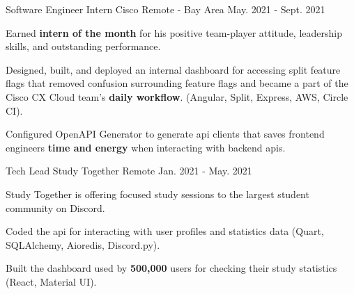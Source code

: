 

\begin{cventries}




  \cventry
  {Software Engineer Intern}
  {Cisco}
  {Remote - Bay Area}
  {May. 2021 - Sept. 2021}
  {
    \begin{cvitems}
    \item{Earned \textbf{intern of the month} for his positive team-player attitude, leadership skills, and outstanding performance.}
    \item{Designed, built, and deployed an internal dashboard for accessing split feature flags that removed confusion surrounding feature flags and became a part of the Cisco CX Cloud team's \textbf{daily workflow}. (Angular, Split, Express, AWS, Circle CI).}
    \item{Configured OpenAPI Generator to generate api clients that saves frontend engineers \textbf{time and energy} when interacting with backend apis.}
    \end{cvitems}
  }

  \cventry
  {Tech Lead}
  {Study Together}
  {Remote}
  {Jan. 2021 - May. 2021}
  {
    \begin{cvitems}
      \item{Study Together is offering focused study sessions to the largest student community on Discord.}
      \item{Coded the api for interacting with user profiles and statistics data (Quart, SQLAlchemy, Aioredis, Discord.py).}
      \item{Built the dashboard used by \textbf{500,000} users for checking their study statistics (React, Material UI).}
    \end{cvitems}
  }


\end{cventries}
